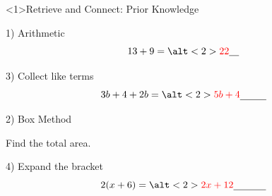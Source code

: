 \documentclass{beamer}
\newcommand{\ablank}[1]{%
  \alt<2>{\textcolor{red}{#1}}{\underline{\phantom{#1}}}%
}
\newcommand{\ashow}[1]{\uncover<2->{\textcolor{red}{\small #1}}}
\newcommand{\ashowq}[1]{\alt<2->{\textcolor{red}{\small #1}}{?}}
\begin{document}
\begin{frame}<1>{Retrieve and Connect: Prior Knowledge}
\begin{minipage}[t]{0.48\textwidth}

\begin{block}{1) Arithmetic}
\Large
\[
13 + 9 = \ablank{22}
\]
\end{block}

\vspace{6.2em}

\begin{block}{3) Collect like terms}
\Large
\[
3b + 4 + 2b = \ablank{5b+4}
\]
\end{block}

\end{minipage}\hfill
\begin{minipage}[t]{0.48\textwidth}

\begin{block}{2) Box Method}
\centering
{}

\vspace{0.4em}
Find the total area. \ashow{Total area $= 32$}

\end{block}

\vspace{0.6em}

\begin{block}{4) Expand the bracket}
\Large
\[
2(x+6) = \ablank{2x+12}
\]
\end{block}

\end{minipage}
\end{frame}
\end{document}
